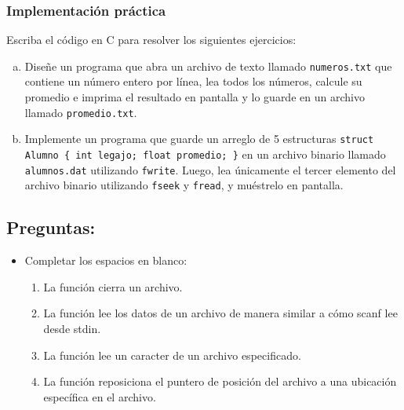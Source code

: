 \begin{ejercicioClase}
    \subsubsection{Implementación práctica}
    Escriba el código en C para resolver los siguientes ejercicios:
    \begin{enumerate}[a)]
        \item Diseñe un programa que abra un archivo de texto llamado \texttt{numeros.txt} que contiene un número entero por línea, lea todos los números, calcule su promedio e imprima el resultado en pantalla y lo guarde en un archivo llamado \texttt{promedio.txt}.
        \item Implemente un programa que guarde un arreglo de 5 estructuras \texttt{struct Alumno \{ int legajo; float promedio; \}} en un archivo binario llamado \texttt{alumnos.dat} utilizando \texttt{fwrite}. Luego, lea únicamente el tercer elemento del archivo binario utilizando \texttt{fseek} y \texttt{fread}, y muéstrelo en pantalla.
    \end{enumerate}
\end{ejercicioClase}

\subsection*{Preguntas:}
\begin{itemize}[a)]
  \item Completar los espacios en blanco:\\
    \begin{enumerate}
      \item La función \underspace cierra un archivo.
      \item La función \underspace lee los datos de un archivo de manera similar a cómo scanf lee desde stdin.
      \item La función \underspace lee un caracter de un archivo especificado.
      \item La función \underspace reposiciona el puntero de posición del archivo a una ubicación específica en el archivo.
    \end{enumerate}
\end{itemize}
